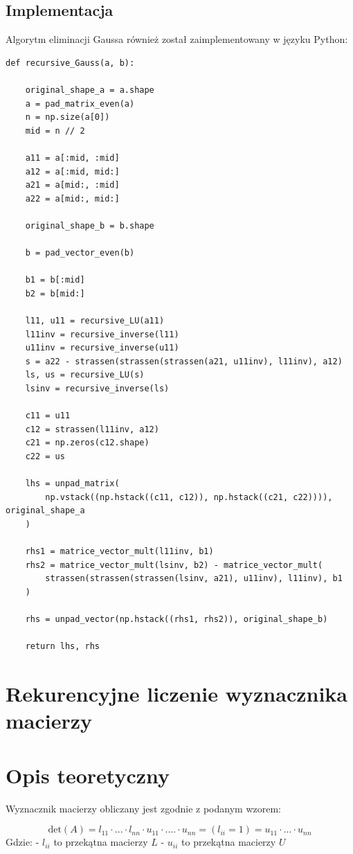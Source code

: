 \documentclass{article}
\begin{document}
\subsection{Implementacja}

Algorytm eliminacji Gaussa również został zaimplementowany w języku Python:

\begin{verbatim}
def recursive_Gauss(a, b):

    original_shape_a = a.shape
    a = pad_matrix_even(a)
    n = np.size(a[0])
    mid = n // 2

    a11 = a[:mid, :mid]
    a12 = a[:mid, mid:]
    a21 = a[mid:, :mid]
    a22 = a[mid:, mid:]

    original_shape_b = b.shape

    b = pad_vector_even(b)

    b1 = b[:mid]
    b2 = b[mid:]

    l11, u11 = recursive_LU(a11)
    l11inv = recursive_inverse(l11)
    u11inv = recursive_inverse(u11)
    s = a22 - strassen(strassen(strassen(a21, u11inv), l11inv), a12)
    ls, us = recursive_LU(s)
    lsinv = recursive_inverse(ls)

    c11 = u11
    c12 = strassen(l11inv, a12)
    c21 = np.zeros(c12.shape)
    c22 = us

    lhs = unpad_matrix(
        np.vstack((np.hstack((c11, c12)), np.hstack((c21, c22)))), original_shape_a
    )

    rhs1 = matrice_vector_mult(l11inv, b1)
    rhs2 = matrice_vector_mult(lsinv, b2) - matrice_vector_mult(
        strassen(strassen(strassen(lsinv, a21), u11inv), l11inv), b1
    )

    rhs = unpad_vector(np.hstack((rhs1, rhs2)), original_shape_b)

    return lhs, rhs
\end{verbatim}

\section{Rekurencyjne liczenie wyznacznika macierzy}

\section{Opis teoretyczny}

Wyznacznik macierzy obliczany jest zgodnie z podanym wzorem:

\[
\text{det}(A) = l_{11} \cdot ... \cdot l_{nn} \cdot u_{11} \cdot .... \cdot u_{nn} = (l_{ii} = 1) = u_{11} \cdot ... \cdot u_{nn}
\]
\bigbreak
Gdzie:
- \( l_{ii} \) to przekątna macierzy \( L \)
- \( u_{ii} \) to przekątna macierzy \( U \)
\end{document}
